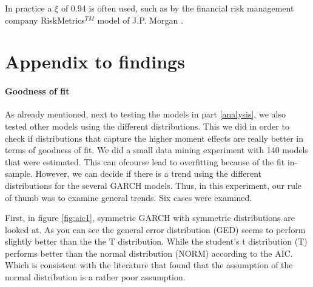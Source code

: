 \documentclass[a4paper, twoside]{templates/ociamthesis}
\begin{document}
In practice a \(\xi\) of 0.94 is often used, such as by the financial risk management company RiskMetrics\(^{TM}\) model of J.P. Morgan \autocite{morganguarantytrustcompany1996}.

\newpage

\hypertarget{appendix-to-findings}{%
\chapter{Appendix to findings}\label{appendix-to-findings}}

\hypertarget{goodness-of-fit}{%
\subsubsection{Goodness of fit}\label{goodness-of-fit}}

\noindent As already mentioned, next to testing the models in part \ref{analysis}, we also tested other models using the different distributions. This we did in order to check if distributions that capture the higher moment effects are really better in terms of goodness of fit. We did a small data mining experiment with 140 models that were estimated. This can ofcourse lead to overfitting because of the fit in-sample. However, we can decide if there is a trend using the different distributions for the several GARCH models. Thus, in this experiment, our rule of thumb was to examine general trends. Six cases were examined. ~\\

\newpage

First, in figure \ref{fig:aic1}, symmetric GARCH with symmetric distributions are looked at. As you can see the general error distribution (GED) seems to perform slightly better than the the T distribution. While the student's t distribution (T) performs better than the normal distribution (NORM) according to the AIC. Which is consistent with the literature that found that the assumption of the normal distribution is a rather poor assumption.
\end{document}
